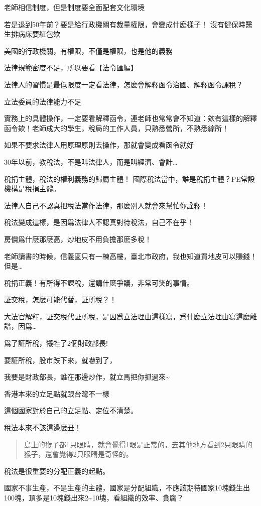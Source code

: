 \documentclass[]{ctexbook}
\begin{document}
老師相信制度，但是制度要全面配套文化環境

若是退到50年前？要是給行政機關有裁量權限，會變成什麽樣子！
沒有健保時醫生排病床要紅包欸

美國的行政機關，有權限，不僅是權限，也是他的義務

法律規範密度不足，所以要看【法令匯編】

法律人的習慣是最低限度一定看法律，怎麽會解釋函令治國、解釋函令課稅？

立法委員的法律能力不足

實務上的具體操作，一定要看解釋函令，連老師也常常會不知道：欸有這樣的解釋函令欸！老師成大的學生，稅局的工作人員，只熟悉營所，不熟悉綜所！

如果不要求法律人用原理原則去操作，那就會變成看函令就好

30年以前，教稅法，不是叫法律人，而是叫經濟、會計\ldots{}

稅捐主體，稅法的權利義務的歸屬主體！
國際稅法當中，誰是稅捐主體？PE常設機構是稅捐主體。

法律人自己不認真把稅法當作法律，那麽別人就會來幫忙你詮釋！

稅法變成這樣，是因爲法律人不認真對待稅法，自己不在乎！

房價爲什麽那麽高，炒地皮不用負擔那麽多稅！

老師讀書的時候，信義區只有一棟高樓，臺北市政府，我也知道買地皮可以賺錢！但是\ldots{}

稅捐正義！有所得不課稅，還講什麽爭議，非常可笑的事情。

証交稅，怎麽可能代替，証所稅？！

大法官解釋，証交稅代証所稅，是因爲立法理由這樣寫，爲什麽立法理由寫這麽離譜，因爲\ldots{}

爲了証所稅，犧牲了2個財政部長!

要証所稅，股市跌下來，就嚇到了，

我要是財政部長，誰在那邊炒作，就立馬把你抓過來\textasciitilde{}

香港本來的立足點就跟台灣不一樣

這個國家對於自己的立足點、定位不清楚。

稅法本來不該這邊麽丑！

\begin{quote}
島上的猴子都1只眼睛，就會覺得1眼是正常的，去其他地方看到2只眼睛的猴子，還會覺得2只眼睛是奇怪的。
\end{quote}

稅法是很重要的分配正義的起點。

國家不事生產，不是生產的主體，國家是分配組織，不應該期待國家10塊錢生出100塊，頂多是10塊錢出來2\textasciitilde10塊，看組織的效率、貪腐？
\end{document}
